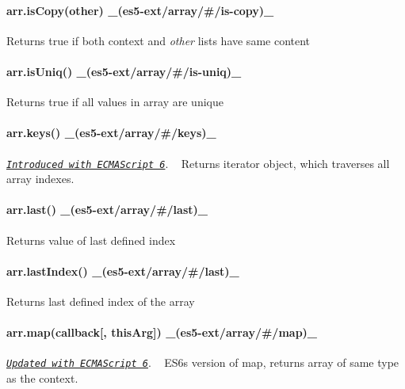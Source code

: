 \paragraph*{arr.\+is\+Copy(other) \+\_\+(es5-\/ext/array/\#/is-\/copy)\+\_\+}

Returns true if both context and {\itshape other} lists have same content

\paragraph*{arr.\+is\+Uniq() \+\_\+(es5-\/ext/array/\#/is-\/uniq)\+\_\+}

Returns true if all values in array are unique

\paragraph*{arr.\+keys() \+\_\+(es5-\/ext/array/\#/keys)\+\_\+}

\href{http://people.mozilla.org/~jorendorff/es6-draft.html#sec-array.prototype.keys}{\tt {\itshape Introduced with E\+C\+M\+A\+Script 6}}. ~\newline
Returns iterator object, which traverses all array indexes.

\paragraph*{arr.\+last() \+\_\+(es5-\/ext/array/\#/last)\+\_\+}

Returns value of last defined index

\paragraph*{arr.\+last\+Index() \+\_\+(es5-\/ext/array/\#/last)\+\_\+}

Returns last defined index of the array

\paragraph*{arr.\+map(callback\mbox{[}, this\+Arg\mbox{]}) \+\_\+(es5-\/ext/array/\#/map)\+\_\+}

\href{http://people.mozilla.org/~jorendorff/es6-draft.html#sec-array.map}{\tt {\itshape Updated with E\+C\+M\+A\+Script 6}}. ~\newline
E\+S6\textquotesingle{}s version of {\ttfamily map}, returns array of same type as the context.

